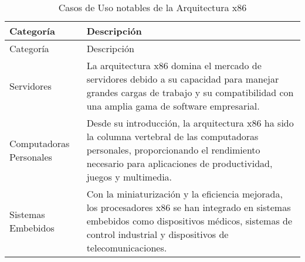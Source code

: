 \documentclass[12pt,twoside]{templates/unerthesis}
\begin{document}
\begin{longtable}[]{@{}ll@{}}
\caption{\label{tab:tabla-casos-uso-x86}Casos de Uso notables de la Arquitectura x86}\tabularnewline
\toprule
\begin{minipage}[b]{0.10\columnwidth}\raggedright
Categoría\strut
\end{minipage} & \begin{minipage}[b]{0.84\columnwidth}\raggedright
Descripción\strut
\end{minipage}\tabularnewline
\midrule
\endfirsthead
\toprule
\begin{minipage}[b]{0.10\columnwidth}\raggedright
Categoría\strut
\end{minipage} & \begin{minipage}[b]{0.84\columnwidth}\raggedright
Descripción\strut
\end{minipage}\tabularnewline
\midrule
\endhead
\begin{minipage}[t]{0.10\columnwidth}\raggedright
Servidores\strut
\end{minipage} & \begin{minipage}[t]{0.84\columnwidth}\raggedright
La arquitectura x86 domina el mercado de servidores debido a su capacidad para manejar grandes cargas de trabajo y su compatibilidad con una amplia gama de software empresarial.\strut
\end{minipage}\tabularnewline
\begin{minipage}[t]{0.10\columnwidth}\raggedright
Computadoras Personales\strut
\end{minipage} & \begin{minipage}[t]{0.84\columnwidth}\raggedright
Desde su introducción, la arquitectura x86 ha sido la columna vertebral de las computadoras personales, proporcionando el rendimiento necesario para aplicaciones de productividad, juegos y multimedia.\strut
\end{minipage}\tabularnewline
\begin{minipage}[t]{0.10\columnwidth}\raggedright
Sistemas Embebidos\strut
\end{minipage} & \begin{minipage}[t]{0.84\columnwidth}\raggedright
Con la miniaturización y la eficiencia mejorada, los procesadores x86 se han integrado en sistemas embebidos como dispositivos médicos, sistemas de control industrial y dispositivos de telecomunicaciones.\strut
\end{minipage}\tabularnewline
\bottomrule
\end{longtable}
\end{document}
